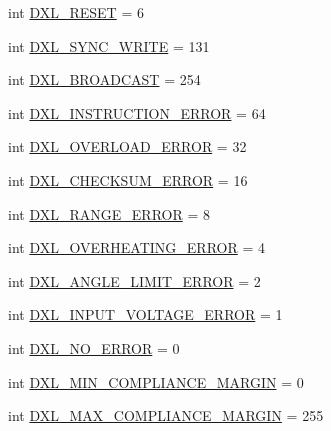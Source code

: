 \begin{DoxyCompactItemize}
int \hyperlink{namespacedynamixel__driver_1_1dynamixel__const_a36892c17b1e93b734e32d440901d87bd}{D\+X\+L\+\_\+\+R\+E\+S\+ET} = 6
\item 
int \hyperlink{namespacedynamixel__driver_1_1dynamixel__const_aeeb30bc9f8bbe3c30342dfbef074aa42}{D\+X\+L\+\_\+\+S\+Y\+N\+C\+\_\+\+W\+R\+I\+TE} = 131
\item 
int \hyperlink{namespacedynamixel__driver_1_1dynamixel__const_afddd998842fa5addc0de88580cde2668}{D\+X\+L\+\_\+\+B\+R\+O\+A\+D\+C\+A\+ST} = 254
\item 
int \hyperlink{namespacedynamixel__driver_1_1dynamixel__const_a4a71ce3d8d0012dd1cb7eedfbd336f04}{D\+X\+L\+\_\+\+I\+N\+S\+T\+R\+U\+C\+T\+I\+O\+N\+\_\+\+E\+R\+R\+OR} = 64
\item 
int \hyperlink{namespacedynamixel__driver_1_1dynamixel__const_af7418dbfc0aab26aa60d8759ceac2614}{D\+X\+L\+\_\+\+O\+V\+E\+R\+L\+O\+A\+D\+\_\+\+E\+R\+R\+OR} = 32
\item 
int \hyperlink{namespacedynamixel__driver_1_1dynamixel__const_a44eec9de6328bb8d0fab06aa7ed13cfd}{D\+X\+L\+\_\+\+C\+H\+E\+C\+K\+S\+U\+M\+\_\+\+E\+R\+R\+OR} = 16
\item 
int \hyperlink{namespacedynamixel__driver_1_1dynamixel__const_a1f56823b7852061487d4b2e4b5f23f97}{D\+X\+L\+\_\+\+R\+A\+N\+G\+E\+\_\+\+E\+R\+R\+OR} = 8
\item 
int \hyperlink{namespacedynamixel__driver_1_1dynamixel__const_a0d284bb2823700d35aeda0cf46c2352b}{D\+X\+L\+\_\+\+O\+V\+E\+R\+H\+E\+A\+T\+I\+N\+G\+\_\+\+E\+R\+R\+OR} = 4
\item 
int \hyperlink{namespacedynamixel__driver_1_1dynamixel__const_ac4fc84ca6542f987a7576b9e5b6d0943}{D\+X\+L\+\_\+\+A\+N\+G\+L\+E\+\_\+\+L\+I\+M\+I\+T\+\_\+\+E\+R\+R\+OR} = 2
\item 
int \hyperlink{namespacedynamixel__driver_1_1dynamixel__const_a869d50b4451e1d1d0a41c024e0b2bb24}{D\+X\+L\+\_\+\+I\+N\+P\+U\+T\+\_\+\+V\+O\+L\+T\+A\+G\+E\+\_\+\+E\+R\+R\+OR} = 1
\item 
int \hyperlink{namespacedynamixel__driver_1_1dynamixel__const_acdc1ef4204afb56cdb16a06969d49dd7}{D\+X\+L\+\_\+\+N\+O\+\_\+\+E\+R\+R\+OR} = 0
\item 
int \hyperlink{namespacedynamixel__driver_1_1dynamixel__const_a33b97f46623bc4f7a7f7a48aff81dd32}{D\+X\+L\+\_\+\+M\+I\+N\+\_\+\+C\+O\+M\+P\+L\+I\+A\+N\+C\+E\+\_\+\+M\+A\+R\+G\+IN} = 0
\item 
int \hyperlink{namespacedynamixel__driver_1_1dynamixel__const_a5cc73353310c9b3d308216afd051122e}{D\+X\+L\+\_\+\+M\+A\+X\+\_\+\+C\+O\+M\+P\+L\+I\+A\+N\+C\+E\+\_\+\+M\+A\+R\+G\+IN} = 255

\end{DoxyCompactItemize}
